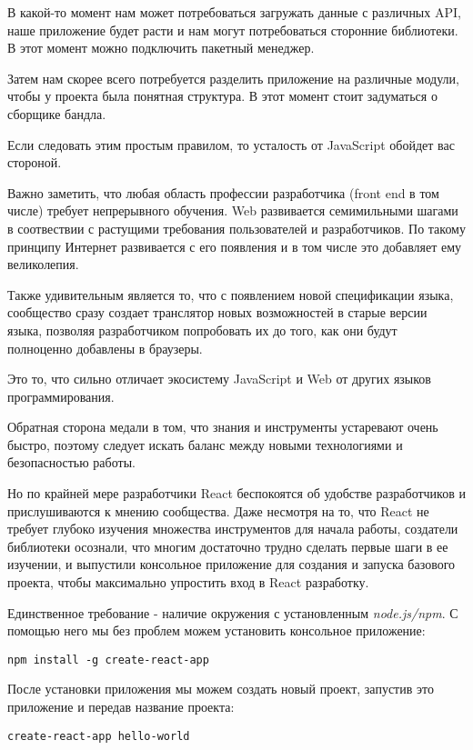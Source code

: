 В какой-то момент нам может потребоваться загружать данные с различных API, наше приложение будет расти и нам могут потребоваться сторонние библиотеки. В этот момент можно подключить пакетный менеджер.

Затем нам скорее всего потребуется разделить приложение на различные модули, чтобы у проекта была понятная структура. В этот момент стоит задуматься о сборщике бандла.

Если следовать этим простым правилом, то усталость от JavaScript обойдет вас стороной.

Важно заметить, что любая область профессии разработчика (front end в том числе) требует непрерывного обучения. Web развивается семимильными шагами в соотвествии с растущими требования пользователей и разработчиков. По такому принципу Интернет развивается с его появления и в том числе это добавляет ему великолепия.

Также удивительным является то, что с появлением новой спецификации языка, сообщество сразу создает транслятор новых возможностей в старые версии языка, позволяя разработчиком попробовать их до того, как они будут полноценно добавлены в браузеры.

Это то, что сильно отличает экосистему JavaScript и Web от других языков программирования.

Обратная сторона медали в том, что знания и инструменты устаревают очень быстро, поэтому следует искать баланс между новыми технологиями и безопасностью работы.

Но по крайней мере разработчики React беспокоятся об удобстве разработчиков и прислушиваются к мнению сообщества. Даже несмотря на то, что React не требует глубоко изучения множества инструментов для начала работы, создатели библиотеки осознали, что многим достаточно трудно сделать первые шаги в ее изучении, и выпустили консольное приложение для создания и запуска базового проекта, чтобы максимально упростить вход в React разработку.

Единственное требование - наличие окружения с установленным \textit{node.js/npm}. С помощью него мы без проблем можем установить консольное приложение:

\begin{lstlisting}
npm install -g create-react-app	
\end{lstlisting}

После установки приложения мы можем создать новый проект, запустив это приложение и передав название проекта:

\begin{lstlisting}
create-react-app hello-world
\end{lstlisting}

